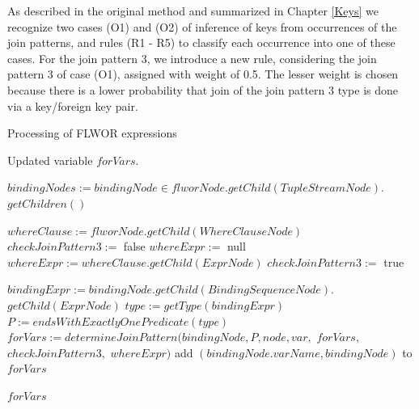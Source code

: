As described in the original method and summarized in Chapter \ref{Keys} we recognize two cases (O1) and (O2) of inference of keys from occurrences of the join patterns, and rules (R1 - R5) to classify each occurrence into one of these cases. For the join pattern 3, we introduce a new rule, considering the join pattern 3 of case (O1), assigned with weight of 0.5.  The lesser weight is chosen because there is a lower probability that join of the join pattern 3 type is done via a key/foreign key pair.

\begin{algorithm}
\caption{Processing of FLWOR expressions}
\label{ALG_processing_of_flwor_expressions}
\begin{algorithmic}[1]

\ENSURE Updated variable $forVars$.

\STATE $bindingNodes := bindingNode \in flworNode.getChild(TupleStreamNode).$ $getChildren()$

\STATE $whereClause := flworNode.getChild(WhereClauseNode)$
\STATE $checkJoinPattern3 :=$ false
\STATE $whereExpr :=$ null
    \STATE $whereExpr := whereClause.getChild(ExprNode)$
        \STATE $checkJoinPattern3 :=$ true
    \ENDIF
\ENDIF

    \STATE $bindingExpr := bindingNode.getChild(BindingSequenceNode).$ $getChild(ExprNode)$
    \STATE $type := getType(bindingExpr)$
    	\STATE $P := endsWithExactlyOnePredicate(type)$
            	\STATE $forVars := determineJoinPattern(bindingNode, P, node, var,$ $forVars,$ $checkJoinPattern3,$ $whereExpr)$
        	\ENDFOR
        \ENDIF
            	\STATE add $(bindingNode.varName, bindingNode)$ to $forVars$
  	       	\ENDIF
        \ENDIF
    \ENDIF
\ENDFOR

\RETURN $forVars$
\end{algorithmic}
\end{algorithm}

